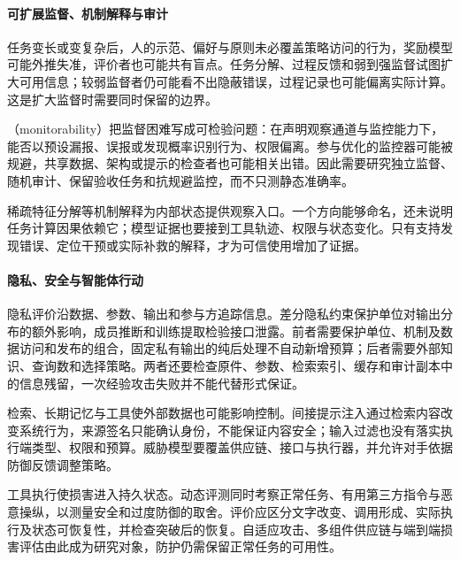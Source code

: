 \paragraph{可扩展监督、机制解释与审计}

任务变长或变复杂后，人的示范、偏好与原则未必覆盖策略访问的行为，奖励模型可能外推失准，评价者也可能共有盲点。任务分解、过程反馈和弱到强监督试图扩大可用信息；较弱监督者仍可能看不出隐蔽错误，过程记录也可能偏离实际计算。这是扩大监督时需要同时保留的边界。

（monitorability）把监督困难写成可检验问题：在声明观察通道与监控能力下，能否以预设漏报、误报或发现概率识别行为、权限偏离。参与优化的监控器可能被规避，共享数据、架构或提示的检查者也可能相关出错。因此需要研究独立监督、随机审计、保留验收任务和抗规避监控，而不只测静态准确率。

稀疏特征分解等机制解释为内部状态提供观察入口。一个方向能够命名，还未说明任务计算因果依赖它；模型证据也要接到工具轨迹、权限与状态变化。只有支持发现错误、定位干预或实际补救的解释，才为可信使用增加了证据。

\paragraph{隐私、安全与智能体行动}

隐私评价沿数据、参数、输出和参与方追踪信息。差分隐私约束保护单位对输出分布的额外影响，成员推断和训练提取检验接口泄露。前者需要保护单位、机制及数据访问和发布的组合，固定私有输出的纯后处理不自动新增预算；后者需要外部知识、查询数和选择策略。两者还要检查原件、参数、检索索引、缓存和审计副本中的信息残留，一次经验攻击失败并不能代替形式保证。

检索、长期记忆与工具使外部数据也可能影响控制。间接提示注入通过检索内容改变系统行为，来源签名只能确认身份，不能保证内容安全；输入过滤也没有落实执行端类型、权限和预算。威胁模型要覆盖供应链、接口与执行器，并允许对手依据防御反馈调整策略。

工具执行使损害进入持久状态。动态评测同时考察正常任务、有用第三方指令与恶意操纵，以测量安全和过度防御的取舍。评价应区分文字改变、调用形成、实际执行及状态可恢复性，并检查突破后的恢复。自适应攻击、多组件供应链与端到端损害评估由此成为研究对象，防护仍需保留正常任务的可用性。

